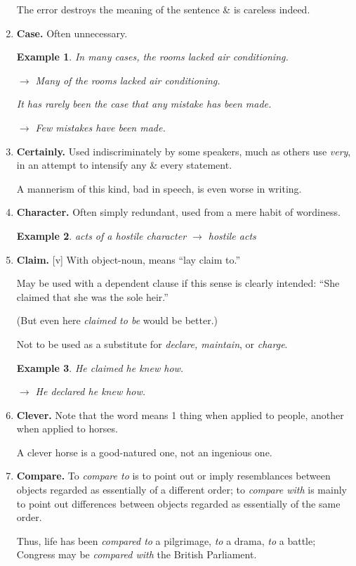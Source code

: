 \documentclass{article}
\newtheorem{example}{Example}
\begin{document}
\begin{enumerate}
	The error destroys the meaning of the sentence \& is careless indeed.
	\item {\bf Case.} Often unnecessary.
	\begin{example}
		In many cases, the rooms lacked air conditioning.
		
		$\to$ Many of the rooms lacked air conditioning.
		
		It has rarely been the case that any mistake has been made.
		
		$\to$ Few mistakes have been made.
	\end{example}
	\item {\bf Certainly.} Used indiscriminately by some speakers, much as others use {\it very}, in an attempt to intensify any \& every statement.
	
	A mannerism of this kind, bad in speech, is even worse in writing.
	\item {\bf Character.} Often simply redundant, used from a mere habit of wordiness.
	\begin{example}
		acts of a hostile character $\to$ hostile acts
	\end{example}
	\item {\bf Claim.} [v] With object-noun, means ``lay claim to.''
	
	May be used with a dependent clause if this sense is clearly intended: ``She claimed that she was the sole heir.''
	
	(But even here {\it claimed to be} would be better.)
	
	Not to be used as a substitute for {\it declare, maintain}, or {\it charge}.
	\begin{example}
		He claimed he knew how.
		
		$\to$ He declared he knew how.
	\end{example}
	\item {\bf Clever.} Note that the word means 1 thing when applied to people, another when applied to horses.
	
	A clever horse is a good-natured one, not an ingenious one.
	\item {\bf Compare.} To {\it compare to} is to point out or imply resemblances between objects regarded as essentially of a different order; to {\it compare with} is mainly to point out differences between objects regarded as essentially of the same order.
	
	Thus, life has been {\it compared to} a pilgrimage, {\it to} a drama, {\it to} a battle; Congress may be {\it compared with} the British Parliament.
	

\end{enumerate}
\end{document}
